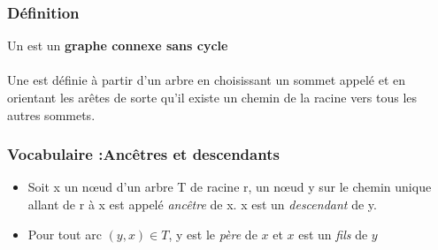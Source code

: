 \begin{frame}
  \frametitle{Définition}
  Un  est un \textbf{graphe connexe sans cycle} %
~\\~\\
Une  est définie à partir d'un arbre en choisissant un sommet appelé  et 
en orientant les arêtes de sorte qu'il existe un chemin de la racine vers tous les autres sommets.


\end{frame}

\begin{frame}
  \frametitle{Vocabulaire :Ancêtres et descendants }
\begin{itemize}
\item Soit x un nœud d’un arbre T de racine r, un nœud y sur le chemin unique allant de r à x est appelé \emph{ancêtre} de x. x est un \emph{descendant} de y.
\item Pour tout arc $(y,x)\in T$, y est le \emph{père} de $x$ et $x$ est un \emph{fils} de $y$
\end{itemize}
\end{frame}


